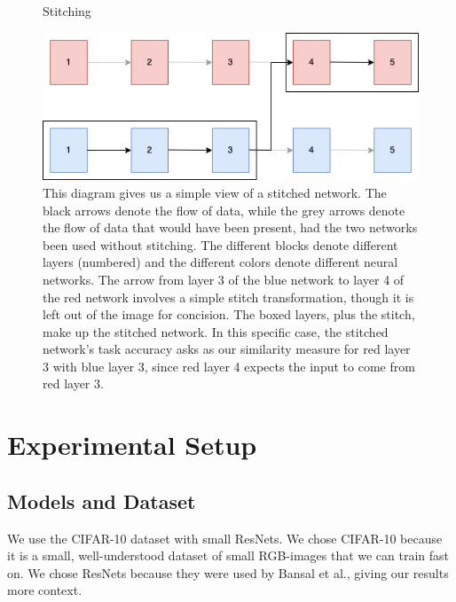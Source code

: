 \documentclass{article} %
\begin{document}
\label{Figure1}
\begin{center}
   \begin{figure}[h!]
      \centering
      \caption{Stitching}
      \includegraphics[width=12cm]{stitch.jpg}
      \caption*{This diagram gives us a simple view of a stitched network. The black arrows denote the flow of data, while
      the grey arrows denote the flow of data that would have been present, had the two networks been used without stitching.
      The different blocks denote different layers (numbered) and the different colors denote different neural networks. The arrow
      from layer 3 of the blue network to layer 4 of the red network involves a simple stitch transformation, though it is left
      out of the image for concision. The boxed layers, plus the stitch, make up the stitched network. In this specific case,
      the stitched network's task accuracy asks as our similarity measure for red layer 3 with 
      blue layer 3, since red layer 4 expects the input to come from red layer 3.}
   \end{figure}
\end{center}

\section{Experimental Setup}
\label{ExperimentalSetup}
\subsection*{Models and Dataset}
We use the CIFAR-10 dataset with small ResNets. We chose CIFAR-10 because it is a small, well-understood dataset
of small RGB-images that we can train fast on. We chose ResNets because they were used by Bansal et al., giving our
results more context.
\end{document}
